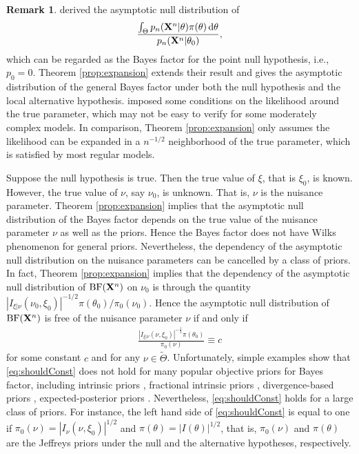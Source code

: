 \documentclass[11pt]{article}
\theoremstyle{plain}
\theoremstyle{definition}
\newtheorem{remark}{\quad\quad Remark}
\theoremstyle{remark}
\begin{document}
\begin{remark}
\cite{clarke1990information} derived the asymptotic null distribution of
$$
\frac{
    {\int_{\Theta} p_n(\mathbf{X}^{n}|\theta) \pi(\theta)\, \mathrm d\theta}
}
{p_n(\mathbf{X}^{n}|\theta_0)}
    ,
$$
which can be regarded as the Bayes factor for the point null hypothesis, i.e., $p_0 = 0$.
Theorem \ref{prop:expansion} extends their result and gives the asymptotic distribution of the general Bayes factor under both the null hypothesis and the local alternative hypothesis.
\cite{clarke1990information} imposed some conditions on the likelihood around the true parameter, which may not be easy to verify for some moderately complex models.
In comparison, Theorem \ref{prop:expansion} only assumes the likelihood can be expanded in a $n^{-1/2}$ neighborhood of the true parameter, which is satisfied by most regular models.
\end{remark}
Suppose the null hypothesis is true.
Then the true value of $\xi$, that is $\xi_0$, is known.
However, the true value of $\nu$, say $\nu_0$, is unknown.
That is, $\nu$ is the nuisance parameter.
Theorem \ref{prop:expansion} implies that the asymptotic null distribution of the Bayes factor depends on the true value of the nuisance parameter $\nu$ as well as the priors.
    Hence the Bayes factor does not have Wilks phenomenon for general priors.
Nevertheless, the dependency of the asymptotic null distribution on the nuisance parameters can be cancelled by a class of priors.
In fact, Theorem \ref{prop:expansion} implies that the dependency of the asymptotic null distribution of $\textrm{BF} (\mathbf{X}^n)$ on $\nu_0$ is through the quantity 
$
           \left|I_{\xi|\nu}(\nu_0, \xi_0)\right|^{- 1 / 2}\pi(\theta_0) 
/
    \pi_0(\nu_0)
 $.
Hence the asymptotic null distribution of $\textrm{BF} (\mathbf{X}^n)$ is free of the nuisance parameter $\nu$ if and only if
\begin{align}\label{eq:shouldConst}
       \frac{
           \left|I_{\xi|\nu}(\nu, \xi_0)\right|^{-\frac 1 2}\pi(\theta_0) 
   }{
    \pi_0(\nu)
}
\equiv c
\end{align}
for some constant $c$ and for any $\nu \in \tilde \Theta$.
Unfortunately, simple examples show that \eqref{eq:shouldConst} does not hold for many popular objective priors for Bayes factor, including intrinsic priors \citep{intrisicBayesFactor}, fractional intrinsic priors \citep{santis1997Alt}, divergence-based priors \citep{Bayarri2008Gen}, expected-posterior priors \citep{Perez2002}.
Nevertheless, \eqref{eq:shouldConst} holds for a large class of priors.
For instance, the left hand side of \eqref{eq:shouldConst} is equal to one if $\pi_0(\nu) = |I_{\nu}(\nu, \xi_0)|^{1/2}$ and $\pi(\theta) = | I (\theta)|^{1/2}$, that is, $\pi_0(\nu)$ and $\pi(\theta)$ are the Jeffreys priors under the null and the alternative hypotheses, respectively.
\end{document}
